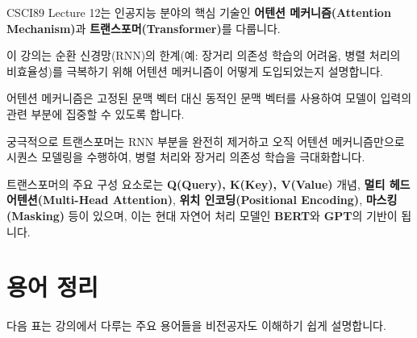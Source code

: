 \documentclass[11pt,a4paper]{article}
\begin{document}
\begin{summarybox}[title={개요: CSCI89 Lecture 12 핵심 요약}]
CSCI89 Lecture 12는 인공지능 분야의 핵심 기술인 \textbf{어텐션 메커니즘(Attention Mechanism)}과 \textbf{트랜스포머(Transformer)}를 다룹니다.

이 강의는 순환 신경망(RNN)의 한계(예: 장거리 의존성 학습의 어려움, 병렬 처리의 비효율성)를 극복하기 위해 어텐션 메커니즘이 어떻게 도입되었는지 설명합니다.

어텐션 메커니즘은 고정된 문맥 벡터 대신 동적인 문맥 벡터를 사용하여 모델이 입력의 관련 부분에 집중할 수 있도록 합니다.

궁극적으로 트랜스포머는 RNN 부분을 완전히 제거하고 오직 어텐션 메커니즘만으로 시퀀스 모델링을 수행하여, 병렬 처리와 장거리 의존성 학습을 극대화합니다.

트랜스포머의 주요 구성 요소로는 \textbf{Q(Query), K(Key), V(Value)} 개념, \textbf{멀티 헤드 어텐션(Multi-Head Attention)}, \textbf{위치 인코딩(Positional Encoding)}, \textbf{마스킹(Masking)} 등이 있으며, 이는 현대 자연어 처리 모델인 \textbf{BERT}와 \textbf{GPT}의 기반이 됩니다.
\end{summarybox}

\newpage
\section*{용어 정리}
다음 표는 강의에서 다루는 주요 용어들을 비전공자도 이해하기 쉽게 설명합니다.
\end{document}
